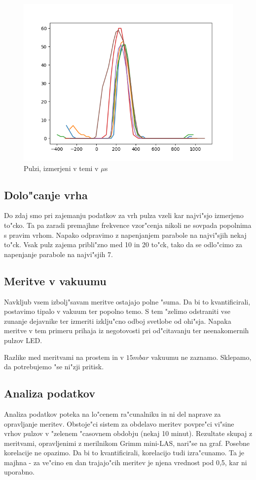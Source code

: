 \documentclass[11pt,a4paper]{article}
\begin{document}
\begin{figure}[H]
	\begin{center}
		\includegraphics[width=12cm]{dark.png}
		\caption{Pulzi, izmerjeni v temi v $\mu$s}
		\label{dark}
	\end{center}
\end{figure}

\subsection{Dolo"canje vrha}
Do zdaj smo pri zajemanju podatkov za vrh pulza vzeli kar najvi"sjo izmerjeno to"cko. Ta pa zaradi premajhne frekvence vzor"cenja nikoli ne sovpada popolnima s pravim vrhom. Napako odpravimo z napenjanjem parabole na najvi"sjih nekaj to"ck. Vsak pulz zajema pribli"zno med 10 in 20 to"ck, tako da se odlo"cimo za napenjanje parabole na najvi"sjih 7.

\subsection{Meritve v vakuumu}
Navkljub vsem izbolj"savam meritve ostajajo polne "suma. Da bi to kvantificirali, postavimo tipalo v vakuum ter popolno temo. S tem "zelimo odstraniti vse zunanje dejavnike ter izmeriti izklju"cno odboj svetlobe od ohi"sja. Napaka meritve v tem primeru prihaja iz negotovosti pri od"citavanju ter neenakomernih pulzov LED.

Razlike med meritvami na prostem in v $ 15mbar $ vakuumu ne zaznamo. Sklepamo, da potrebujemo "se ni"zji pritisk.


\subsection{Analiza podatkov}
Analiza podatkov poteka na lo"cenem ra"cunalniku in ni del naprave za opravljanje meritev. Obstoje"ci sistem za obdelavo meritev povpre"ci vi"sine vrhov pulzov v "zelenem "casovnem obdobju (nekaj 10 minut). Rezultate skupaj z meritvami, opravljenimi z merilnikom Grimm mini-LAS, nari"se na graf. Posebne korelacije ne opazimo. Da bi to kvantificirali, korelacijo tudi izra"cunamo. Ta je majhna - za ve"cino en dan trajajo"cih meritev je njena vrednost pod 0,5, kar ni uporabno.
\end{document}
